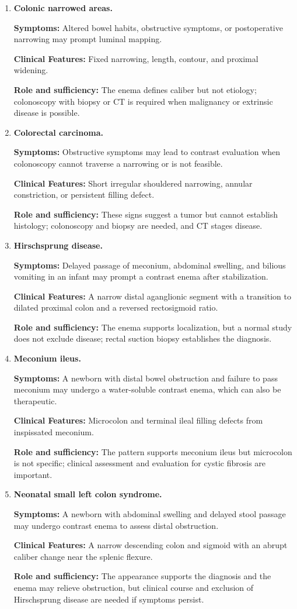 \begin{enumerate}[leftmargin=*,itemsep=0.45em,topsep=0.4em]
\item \textbf{Colonic narrowed areas.}\par\noindent\textbf{Symptoms:} Altered bowel habits, obstructive symptoms, or postoperative narrowing may prompt luminal mapping.\par\noindent\textbf{Clinical Features:} Fixed narrowing, length, contour, and proximal widening.\par\noindent\textbf{Role and sufficiency:} The enema defines caliber but not etiology; colonoscopy with biopsy or CT is required when malignancy or extrinsic disease is possible.
\item \textbf{Colorectal carcinoma.}\par\noindent\textbf{Symptoms:} Obstructive symptoms may lead to contrast evaluation when colonoscopy cannot traverse a narrowing or is not feasible.\par\noindent\textbf{Clinical Features:} Short irregular shouldered narrowing, annular constriction, or persistent filling defect.\par\noindent\textbf{Role and sufficiency:} These signs suggest a tumor but cannot establish histology; colonoscopy and biopsy are needed, and CT stages disease.
\item \textbf{Hirschsprung disease.}\par\noindent\textbf{Symptoms:} Delayed passage of meconium, abdominal swelling, and bilious vomiting in an infant may prompt a contrast enema after stabilization.\par\noindent\textbf{Clinical Features:} A narrow distal aganglionic segment with a transition to dilated proximal colon and a reversed rectosigmoid ratio.\par\noindent\textbf{Role and sufficiency:} The enema supports localization, but a normal study does not exclude disease; rectal suction biopsy establishes the diagnosis.
\item \textbf{Meconium ileus.}\par\noindent\textbf{Symptoms:} A newborn with distal bowel obstruction and failure to pass meconium may undergo a water-soluble contrast enema, which can also be therapeutic.\par\noindent\textbf{Clinical Features:} Microcolon and terminal ileal filling defects from inspissated meconium.\par\noindent\textbf{Role and sufficiency:} The pattern supports meconium ileus but microcolon is not specific; clinical assessment and evaluation for cystic fibrosis are important.
\item \textbf{Neonatal small left colon syndrome.}\par\noindent\textbf{Symptoms:} A newborn with abdominal swelling and delayed stool passage may undergo contrast enema to assess distal obstruction.\par\noindent\textbf{Clinical Features:} A narrow descending colon and sigmoid with an abrupt caliber change near the splenic flexure.\par\noindent\textbf{Role and sufficiency:} The appearance supports the diagnosis and the enema may relieve obstruction, but clinical course and exclusion of Hirschsprung disease are needed if symptoms persist.

\end{enumerate}
